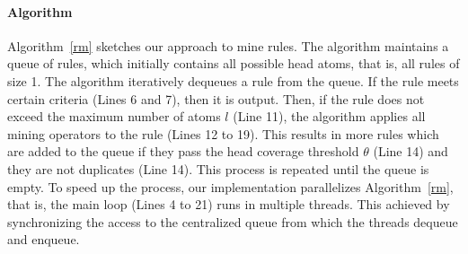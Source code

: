 {\paragraph{Algorithm} \label{algo}
Algorithm~\ref{rm} sketches our approach to mine rules. The algorithm maintains a queue of rules, 
which initially contains all possible head atoms, that is,
all rules of size 1.
The algorithm iteratively dequeues a rule from the queue. If the rule 
meets certain criteria (Lines 6 and 7), then it is output.
Then, if the rule does not exceed the maximum number of atoms $l$ (Line 11), 
the algorithm applies all mining operators to the rule (Lines 12 to 19). This results in more rules which are added to 
the queue if they pass the head coverage threshold $\theta$ (Line 14) and they are not duplicates (Line 14).
This process is repeated until the queue is empty. 
To speed up the process, our implementation parallelizes Algorithm~\ref{rm}, that is, the main loop (Lines 4 to 21) runs
in multiple threads. 
This achieved by synchronizing the access to the centralized queue from which the threads dequeue and enqueue.



}
